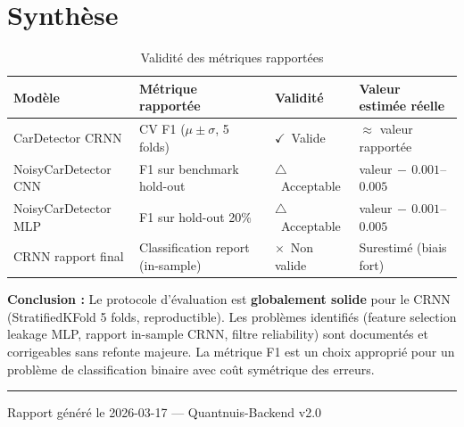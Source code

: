 \documentclass[11pt,a4paper]{article}
\newcommand{\ok}{{\color{okborder}$\checkmark$}}
\newcommand{\warn}{{\color{warnborder}$\triangle$}}
\newcommand{\fail}{{\color{dangerBorder}$\times$}}
\begin{document}
\section{Synthèse}

\begin{table}[h!]
\centering
\renewcommand{\arraystretch}{1.5}
\begin{tabular}{llll}
\toprule
\textbf{Modèle} & \textbf{Métrique rapportée} & \textbf{Validité} & \textbf{Valeur estimée réelle} \\
\midrule
CarDetector CRNN     & CV F1 ($\mu \pm \sigma$, 5 folds) & \ok~Valide   & $\approx$ valeur rapportée \\
NoisyCarDetector CNN & F1 sur benchmark hold-out         & \warn~Acceptable & valeur$\,-\,0.001$--$0.005$ \\
NoisyCarDetector MLP & F1 sur hold-out 20\%              & \warn~Acceptable & valeur$\,-\,0.001$--$0.005$ \\
\midrule
CRNN rapport final   & Classification report (in-sample) & \fail~Non valide & Surestimé (biais fort) \\
\bottomrule
\end{tabular}
\caption{Validité des métriques rapportées}
\end{table}

\vspace{0.5cm}

\begin{infobox}
\textbf{Conclusion :} Le protocole d'évaluation est \textbf{globalement solide} pour le CRNN
(StratifiedKFold 5 folds, reproductible). Les problèmes identifiés
(feature selection leakage MLP, rapport in-sample CRNN, filtre reliability) sont documentés
et corrigeables sans refonte majeure. La métrique F1 est un choix approprié pour
un problème de classification binaire avec coût symétrique des erreurs.
\end{infobox}

\vspace{1cm}
\hrule
\vspace{0.3cm}
\begin{center}
\small\color{sectioncolor}
Rapport généré le 2026-03-17 --- Quantnuis-Backend v2.0
\end{center}
\end{document}

